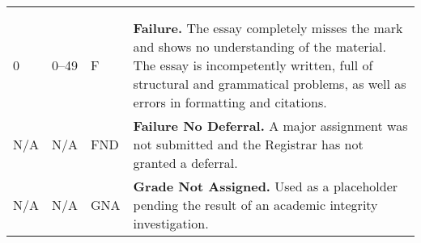 \documentclass[12pt]{article}
\begin{document}
{\begin{tabular}{|l|l|l|l|}
& & & \\
& & & \\
\hline
\multirow{4}{*}{0} & \multirow{4}{*}{0--49} & \multirow{4}{*}{F} & \multirow{4}{4in}{\textbf{Failure.} The essay completely misses the mark and shows no understanding of the material. The essay is incompetently written, full of structural and grammatical problems, as well as errors in formatting and citations.}\\
& & & \\
& & & \\
& & & \\
\hline
\multirow{2}{*}{N/A} & \multirow{2}{*}{N/A} & \multirow{2}{*}{FND} & \multirow{2}{4in}{\textbf{Failure No Deferral.} A major assignment was not submitted and the Registrar has not granted a deferral.}\\
& & & \\
\hline
\multirow{2}{*}{N/A} & \multirow{2}{*}{N/A} & \multirow{2}{*}{GNA} & \multirow{2}{4in}{\textbf{Grade Not Assigned.} Used as a placeholder pending the result of an academic integrity investigation.}\\
& & & \\
\hline
\end{tabular}
}
\end{document}
